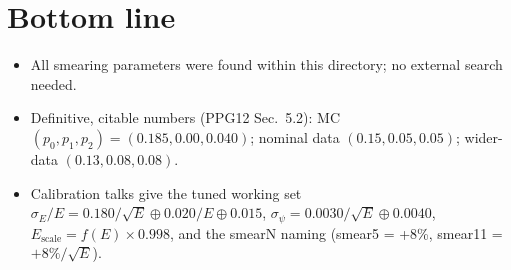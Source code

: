 \documentclass[11pt]{article}
\begin{document}
\section{Bottom line}
\begin{itemize}[nosep,leftmargin=1.4em]
  \item All smearing parameters were found within this directory; no external search needed.
  \item Definitive, citable numbers (PPG12 Sec.~5.2):
        MC $(p_0,p_1,p_2)=(0.185,0.00,0.040)$;
        nominal data $(0.15,0.05,0.05)$;
        wider-data $(0.13,0.08,0.08)$.
  \item Calibration talks give the tuned working set
        $\sigma_E/E = 0.180/\sqrt{E}\oplus 0.020/E\oplus 0.015$,
        $\sigma_\psi = 0.0030/\sqrt{E}\oplus 0.0040$,
        $E_{\text{scale}}=f(E)\times0.998$, and the smearN naming
        (smear5 = +8\%, smear11 = $+8\%/\sqrt{E}$).
\end{itemize}
\end{document}
